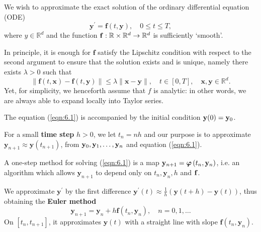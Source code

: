 \documentclass[a4paper]{article}
\begin{document}
\begin{problem}
    We wish to approximate the exact solution of the ordinary differential equation (ODE)
\begin{equation}\label{eqn:6.1}
    \mathbf{y}^{\prime}=\mathbf{f}(t, \mathbf{y}), \quad 0 \leq t \leq T,
\end{equation}
where $y \in \mathbb{R}^d$ and the function ${\bf f}: \mathbb{R} \times \mathbb{R}^d \rightarrow \mathbb{R}^d$ is sufficiently `smooth'.
\end{problem}

In principle, it is enough for $\mathbf{f}$ satisfy the Lipschitz condition with respect to the second argument to ensure that the solution exists and is unique, namely there exists $\lambda>0$ such that
\begin{equation}\label{eqn:6.2}
    \|\mathbf{f}(t, \mathbf{x})-\mathbf{f}(t, \mathbf{y})\| \leq \lambda\|\mathbf{x}-\mathbf{y}\|, \quad t \in[0, T], \quad \mathbf{x}, \mathbf{y} \in \mathbb{R}^d .
\end{equation}
Yet, for simplicity, we henceforth assume that $f$ is analytic: in other words, we are always able to expand locally into Taylor series.

The equation (\ref{eqn:6.1}) is accompanied by the initial condition ${\bf y}(0)={\bf y}_0$.

For a small \textbf{time step} $h>0$, we let $t_n=n h$ and our purpose is to approximate $\mathbf{y}_{n+1} \approx \mathbf{y}\left(t_{n+1}\right)$, from ${\bf y}_0, {\bf y}_1, \ldots, {\bf y}_n$ and equation (\ref{eqn:6.1}).

\begin{definition}
    A one-step method for solving (\ref{eqn:6.1}) is a map $\mathbf{y}_{n+1}=\boldsymbol{\varphi}\left(t_n, {\bf y}_n\right)$, i.e. an algorithm which allows $\mathbf{y}_{n+1}$ to depend only on $t_n, \mathbf{y}_n, h$ and ${\bf f}$.
\end{definition}

\begin{method}
    We approximate $\mathbf{y}^{\prime}$ by the first difference $\mathbf{y}^{\prime}(t) \approx \frac{1}{h}(\mathbf{y}(t+h)-\mathbf{y}(t))$, thus obtaining the \textbf{Euler method}
\begin{equation}\label{eqn:6.3}
    \mathbf{y}_{n+1}=\mathbf{y}_n+h \mathbf{f}\left(t_n, \mathbf{y}_n\right), \quad n=0,1, \ldots
\end{equation}
On $\left[t_n, t_{n+1}\right]$, it approximates $\mathbf{y}(t)$ with a straight line with slope $\mathbf{f}\left(t_n, \mathbf{y}_{n}\right)$.
\end{method}
\end{document}
